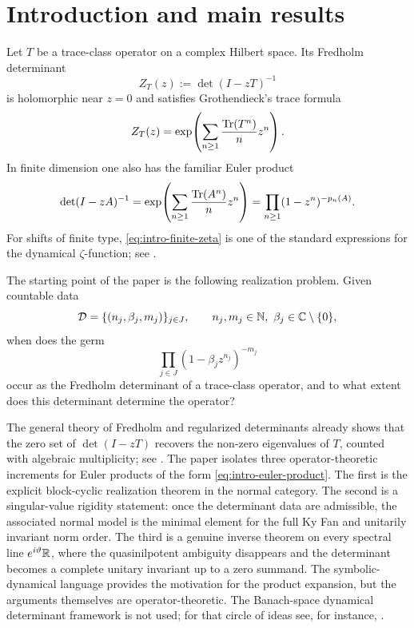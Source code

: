 \section{Introduction and main results}\label{sec:introduction}

Let \(T\) be a trace-class operator on a complex Hilbert space. Its
Fredholm determinant
\[
  Z_T(z):=\det(I-zT)^{-1}
\]
is holomorphic near \(z=0\) and satisfies Grothendieck's trace formula
\[
  Z_T(z)=\exp\!\left(\sum_{n\ge 1}\frac{\operatorname{Tr}(T^n)}{n}z^n\right).
\]
In finite dimension one also has the familiar Euler product
\begin{equation}\label{eq:intro-finite-zeta}
  \det(I-zA)^{-1}
  =\exp\!\left(\sum_{n\ge 1}\frac{\operatorname{Tr}(A^n)}{n}z^n\right)
  =\prod_{n\ge 1}(1-z^n)^{-p_n(A)}.
\end{equation}
For shifts of finite type, \eqref{eq:intro-finite-zeta} is one of the
standard expressions for the dynamical \(\zeta\)-function; see
\cite{BowenLanford1970Zeta,Manning1971Axiom,Ruelle1976ZetaExpanding,ParryPollicott1990Zeta,LindMarcus1995}.

The starting point of the paper is the following realization problem.
Given countable data
\[
  \mathcal D=\{(n_j,\beta_j,m_j)\}_{j\in J},
  \qquad
  n_j,m_j\in\mathbb{N},\ \beta_j\in\mathbb{C}\setminus\{0\},
\]
when does the germ
\begin{equation}\label{eq:intro-euler-product}
  \prod_{j\in J}(1-\beta_j z^{n_j})^{-m_j}
\end{equation}
occur as the Fredholm determinant of a trace-class operator, and to what
extent does this determinant determine the operator?

The general theory of Fredholm and regularized determinants already
shows that the zero set of \(\det(I-zT)\) recovers the non-zero
eigenvalues of \(T\), counted with algebraic multiplicity; see
\cite{Grothendieck1956,GohbergKrein1969,Simon2005TraceIdeals}. The
paper isolates three operator-theoretic increments for Euler products
of the form \eqref{eq:intro-euler-product}. The first is the explicit
block-cyclic realization theorem in the normal category. The second is
a singular-value rigidity statement: once the determinant data are
admissible, the associated normal model is the minimal element for the
full Ky Fan and unitarily invariant norm order. The third is a genuine
inverse theorem on every spectral line \(e^{i\vartheta}\mathbb{R}\), where the
quasinilpotent ambiguity disappears and the determinant becomes a
complete unitary invariant up to a zero summand. The symbolic-dynamical
language provides the motivation for the product expansion, but the
arguments themselves are operator-theoretic. The Banach-space dynamical
determinant framework is not used; for that circle of ideas see, for
instance,
\cite{Fried1986,Ruelle1990Extension,Pollicott1986Meromorphic,Keller1989Fredholm,Baladi2018DynZeta}.

